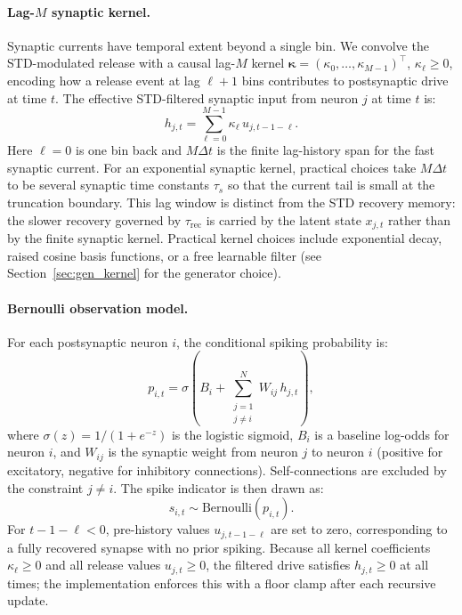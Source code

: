 \documentclass[11pt]{article}
\begin{document}
\paragraph{Lag-$M$ synaptic kernel.}
Synaptic currents have temporal extent beyond a single bin. We convolve the
STD-modulated release with a causal lag-$M$ kernel
$\bm{\kappa}=(\kappa_0,\dots,\kappa_{M-1})^\top$, $\kappa_\ell\geq 0$, encoding how
a release event at lag $\ell+1$ bins contributes to postsynaptic drive at time $t$.
The effective STD-filtered synaptic input from neuron $j$ at time $t$ is:
\begin{equation}
h_{j,t} = \sum_{\ell=0}^{M-1}\kappa_\ell\,u_{j,t-1-\ell}.
\label{eq:lag_kernel}
\end{equation}
Here $\ell=0$ is one bin back and $M\Delta t$ is the finite lag-history span for the fast synaptic current.
For an exponential synaptic kernel, practical choices take $M\Delta t$ to be
several synaptic time constants $\tau_s$ so that the current tail is small at
the truncation boundary. This lag window is distinct from the STD recovery
memory: the slower recovery governed by $\tau_{\mathrm{rec}}$ is carried by the
latent state $x_{j,t}$ rather than by the finite synaptic kernel. Practical
kernel choices include exponential decay, raised cosine basis functions, or a
free learnable filter (see Section~\ref{sec:gen_kernel} for the generator
choice).

\paragraph{Bernoulli observation model.}
For each postsynaptic neuron $i$, the conditional spiking probability is:
\begin{equation}
p_{i,t}
=
\sigma\!\left(
B_i
+
\sum_{\substack{j=1\\j\neq i}}^{N}
W_{ij}\,h_{j,t}
\right),
\label{eq:bernoulli_obs}
\end{equation}
where $\sigma(z)=1/(1+e^{-z})$ is the logistic sigmoid, $B_i$ is a baseline
log-odds for neuron $i$, and $W_{ij}$ is the synaptic weight from neuron $j$
to neuron $i$ (positive for excitatory, negative for inhibitory connections).
Self-connections are excluded by the constraint $j\neq i$.
The spike indicator is then drawn as:
\begin{equation}
s_{i,t} \sim \mathrm{Bernoulli}(p_{i,t}).
\label{eq:bernoulli_likelihood}
\end{equation}
For $t-1-\ell<0$, pre-history values $u_{j,t-1-\ell}$ are set to zero, corresponding
to a fully recovered synapse with no prior spiking.
Because all kernel coefficients $\kappa_\ell\geq0$ and all release values
$u_{j,t}\geq0$, the filtered drive satisfies $h_{j,t}\geq0$ at all times;
the implementation enforces this with a floor clamp after each recursive update.
\end{document}

